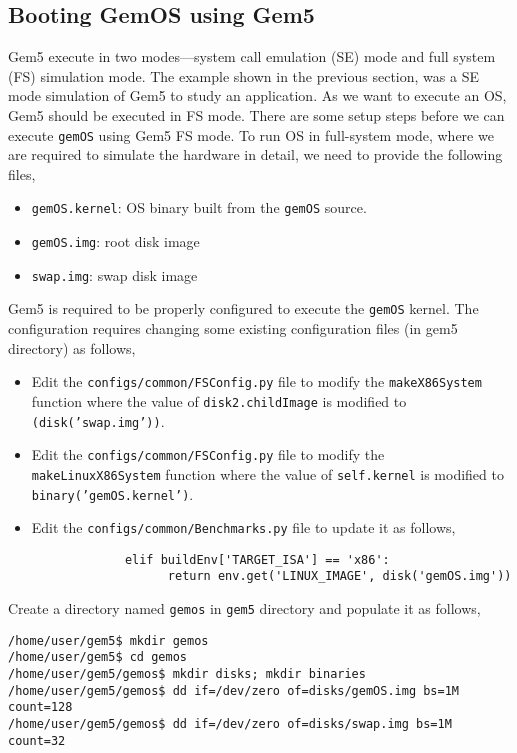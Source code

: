 \documentclass{article}
\begin{document}
\subsection*{Booting GemOS using Gem5} 
Gem5 execute in two modes---system call emulation (SE) mode and full system (FS) simulation mode.
%
The example shown in the previous section, was a SE mode simulation of Gem5 to study an application.
%
As we want to execute an OS, Gem5 should be executed in FS mode. 
%
There are some setup steps before we can execute \texttt{gemOS} using Gem5 FS mode.
%
To run OS in full-system mode, where we are required to simulate the hardware in detail, 
we need to provide the following files,
\begin{itemize}
    \item \texttt{gemOS.kernel}: OS binary built from the \texttt{gemOS} source. 
    \item \texttt{gemOS.img}: root disk image
    \item \texttt{swap.img}: swap disk image
\end{itemize}

Gem5 is required to be properly configured to execute the \texttt{gemOS} kernel. 
The configuration requires changing
some existing configuration files (in gem5 directory) as follows,
\begin{itemize}
   \item Edit the \texttt{configs/common/FSConfig.py} file to modify the \texttt{makeX86System} function
         where the value of \texttt{disk2.childImage} is modified to \texttt{(disk('swap.img'))}.
   \item Edit the \texttt{configs/common/FSConfig.py} file to modify the \texttt{makeLinuxX86System} function
         where the value of \texttt{self.kernel} is modified to  \texttt{binary('gemOS.kernel')}.
   \item Edit the \texttt{configs/common/Benchmarks.py} file to update it as follows, 
         \begin{verbatim}
             elif buildEnv['TARGET_ISA'] == 'x86':
                   return env.get('LINUX_IMAGE', disk('gemOS.img'))
         \end{verbatim}
\end{itemize}
\noindent
Create a directory named \texttt{gemos} in \texttt{gem5} directory and populate it as follows,

\vspace{0.25cm}
\noindent
\texttt{/home/user/gem5\$ mkdir gemos} \\
\texttt{/home/user/gem5\$ cd gemos} \\
\texttt{/home/user/gem5/gemos\$ mkdir disks; mkdir binaries} \\
\texttt{/home/user/gem5/gemos\$ dd if=/dev/zero of=disks/gemOS.img bs=1M count=128} \\
\texttt{/home/user/gem5/gemos\$ dd if=/dev/zero of=disks/swap.img bs=1M count=32} \\
\end{document}
